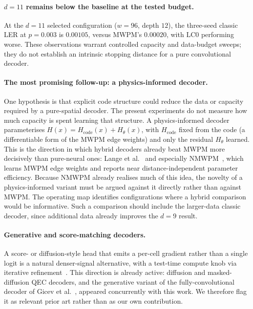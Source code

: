 \documentclass[11pt,a4paper]{article}
\begin{document}
\paragraph{$d=11$ remains below the baseline at the tested budget.}
At the $d=11$ selected configuration ($w=96$, depth $12$), the
three-seed classic LER at $p=0.003$ is $0.00105$, versus MWPM's
$0.00020$, with LC0 performing worse. These observations warrant
controlled capacity and data-budget sweeps; they do not establish an
intrinsic stopping distance for a pure convolutional decoder.

\paragraph{The most promising follow-up: a physics-informed decoder.}
One hypothesis is that explicit code structure could reduce the data or
capacity required by a pure-spatial decoder. The present experiments do
not measure how much capacity is spent learning that structure. A
physics-informed decoder parameterises $H(x) = H_{\text{code}}(x) +
H_{\theta}(x)$, with $H_{\text{code}}$ fixed from the code (a
differentiable form of the MWPM edge weights) and only the residual
$H_{\theta}$ learned. This is the direction in which hybrid decoders
already beat MWPM more decisively than pure-neural ones: Lange et
al.~\cite{lange2025gnn} and especially NMWPM~\cite{peled2026nmwpm}, which
learns MWPM edge weights and reports near distance-independent parameter
efficiency. Because NMWPM already realises much of this idea, the novelty
of a physics-informed variant must be argued against it directly rather
than against MWPM. The operating map identifies configurations where a hybrid comparison
would be informative. Such a comparison should include the larger-data
classic decoder, since additional data already improves the $d=9$ result.

\paragraph{Generative and score-matching decoders.}
A score- or diffusion-style head that emits a per-cell gradient rather than
a single logit is a natural denser-signal alternative, with a test-time
compute knob via iterative refinement~\cite{ho2020ddpm}. This direction is
already active: diffusion and masked-diffusion QEC decoders, and the
generative variant of the fully-convolutional decoder of Gicev et
al.~\cite{gicev2025fcn}, appeared concurrently with this work. We
therefore flag it as relevant prior art rather than as our own
contribution.
\end{document}

